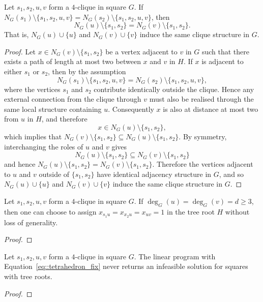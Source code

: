 
\begin{lemma} \label{lemma::tetrahedron_subset_neighbourhood}
  Let $s_1,s_2,u,v$ form a $4$-clique in square $G$. If $N_G(s_1)\setminus\{s_1,s_2,u,v\}=N_G(s_2)\setminus\{s_1,s_2,u,v\}$, then
  \[
  N_G(u)\setminus\{s_1, s_2\}=N_G(v)\setminus\{s_1, s_2\}.
  \]
  That is, $N_G(u)\cup\{u\}$ and $N_G(v)\cup\{v\}$ induce the same clique structure in $G$.
\end{lemma}
\begin{proof}
  Let $x \in N_G(v)\setminus\{s_1,s_2\}$ be a vertex adjacent to $v$ in $G$ such that there exists a path of length at most two between $x$ and $v$ in $H$. If $x$ is adjacent to either $s_1$ or $s_2$, then by the assumption
  \[
  N_G(s_1)\setminus\{s_1,s_2,u,v\}
  =
  N_G(s_2)\setminus\{s_1,s_2,u,v\},
  \]
  where the vertices $s_1$ and $s_2$ contribute identically outside the clique. Hence any external connection from the clique through $v$ must also be realised through the same local structure containing $u$. Consequently $x$ is also at distance at most two from $u$ in $H$, and therefore
  \[
  x\in N_G(u)\setminus\{s_1,s_2\},
  \]
  which implies that $N_G(v)\setminus\{s_1,s_2\} \subseteq N_G(u)\setminus\{s_1,s_2\}$. By symmetry, interchanging the roles of $u$ and $v$ gives
  \[
  N_G(u)\setminus\{s_1,s_2\} \subseteq N_G(v)\setminus\{s_1,s_2\} 
  \]
  and hence  $N_G(u)\setminus\{s_1,s_2\} = N_G(v)\setminus\{s_1,s_2\}$. Therefore the vertices adjacent to $u$ and $v$ outside of $\{s_1,s_2\}$ have identical adjacency structure in $G$, and so $N_G(u)\cup\{u\}$ and $N_G(v)\cup\{v\}$ induce the same clique structure in $G$.
\end{proof}

\begin{proposition} \label{prop::textrahedron_decomposition_equality}
  Let $s_1,s_2,u,v$ form a $4$-clique in square $G$. If $\deg_G(u)=\deg_G(v)=d\geq3$, then one can choose to assign $x_{s_1u}=x_{x_2u}=x_{uv}=1$ in the tree root $H$ without loss of generality.
\end{proposition}
\begin{proof}
  
\end{proof}

\begin{proposition} \label{prop::tetrahedron_decomposition_feasibility}
  Let $s_1,s_2,u,v$ form a $4$-clique in square $G$. The linear program with Equation~\eqref{eq::tetrahedron_fix} never returns an infeasible solution for squares with tree roots. 
\end{proposition}
\begin{proof}
  
\end{proof}

